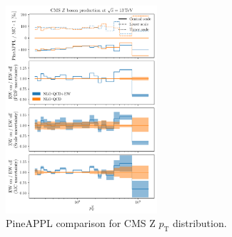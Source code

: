 \begin{figure}[!t]
    \centering
    \includegraphics[width=0.5\textwidth]{figures/pineappl_CMS_Z_13_TEV}
    \caption{PineAPPL comparison for CMS Z $p_\mathrm{T}$ distribution.}
    \label{fig:cmsZ13TeV}
\end{figure}



